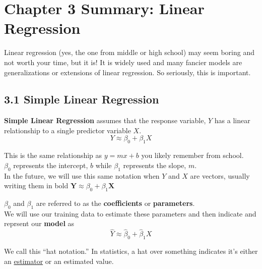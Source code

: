 

    \section*{Chapter 3 Summary: Linear Regression}\label{chapter-3-summary-linear-regression}
        Linear regression (yes, the one from middle or high school) may seem boring and not worth your time, but it is! 
        It is widely used and many    fancier models are generalizations or extensions of linear regression.    So seriously, this is important.
        \subsection*{3.1 Simple Linear Regression}
        \textbf{Simple Linear Regression} assumes that the response variable, \(Y\) has a linear relationship to a single predictor variable \(X\).
        \begin{equation*}\tag{3.1}
            Y \approx \beta_0 + \beta_1 X
        \end{equation*}
        
        
        \begin{note}
            This is the same relationship as \(y=mx+b\) you likely remember from school.\\
            \(\beta_0\) represents the intercept, \(b\) while \(\beta_1\) represents the slope, \(m\).\\
            In the future, we will use this same notation when \(Y\) and \(X\) are vectors, usually writing them in bold \(\mathbf{Y} \approx \beta_0 + \beta_1 \mathbf{X}\)
        \end{note}
        
        \(\beta_0\) and \(\beta_1\) are referred to as the \textbf{coefficients} or \textbf{parameters}.\\
        We will use our training data to estimate these parameters and then indicate and reprsent our \textbf{model} as
        \begin{equation*}\tag{3.2}
            \hat Y \approx \hat \beta_0 + \hat \beta_1 X
        \end{equation*}

        \begin{note}
            We call this ``hat notation.'' In statistics, a hat over something indicates it's either an
            \href{https://en.wikipedia.org/wiki/Estimator}{estimator} or an estimated value.
        \end{note}
        
